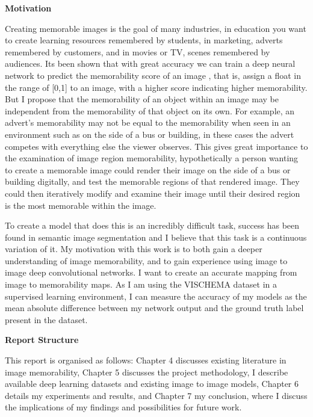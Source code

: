 \documentclass{UoYCSproject}
\begin{document}
\textbf{Motivation}


Creating memorable images is the goal of many industries, in education you want to create learning resources remembered by students, in marketing, adverts remembered by customers, and in movies or TV, scenes remembered by audiences. Its been shown that with great accuracy we can train a deep neural network to predict the memorability score of an image \cite{Isola2011, IsolaParikhTorralbaOliva2011, ICCV15_Khosla, isola2014memorability},
that is, assign a float in the range of [0,1] to an image, with a higher score indicating higher memorability. But I propose that the memorability of an object within an image may be independent from the memorability of that object on its own. For example, an advert's memorability may not be equal to the memorability when seen in an environment such as on the side of a bus or building, in these cases the advert competes with everything else the viewer observes. This gives great importance to the examination of image region memorability, hypothetically a person wanting to create a memorable image could render their image on the side of a bus or building digitally, and test the memorable regions of that rendered image. They could then iteratively modify and examine their image until their desired region is the most memorable within the image.


To create a model that does this is an incredibly difficult task, success has been found in semantic image segmentation \cite{wang2023internimage} and I believe that this task is a continuous variation of it. My motivation with this work is to both gain a deeper understanding of image memorability, and to gain experience using image to image deep convolutional networks. I want to create an accurate mapping from image to memorability maps. As I am using the VISCHEMA dataset in a supervised learning environment, I can measure the accuracy of my models as the mean absolute difference between my network output and the ground truth label present in the dataset.

\textbf{Report Structure}

This report is organised as follows: Chapter 4 discusses existing literature in image memorability, Chapter 5 discusses the project methodology, I describe available deep learning datasets and existing image to image models, Chapter 6 details my experiments and results, and Chapter 7 my conclusion, where I discuss the implications of my findings and possibilities for future work.    
\end{document}
